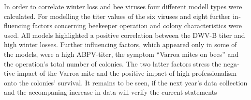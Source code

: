 \begin{otherlanguage}{english}
\newline
In order to correlate winter loss and bee viruses four different modell types were calculated. For modelling the titer values of the six viruses and eight further influencing factors concerning beekeeper operation and colony characteristics were used. All models highlighted a positive correlation between the DWV-B titer and high winter losses. Further influencing factors, which appeared only in some of the models, were a high ABPV-titer, the symptom \enquote{Varroa mites on bees} and the operation's total number of colonies. The two latter factors stress the negative impact of the Varroa mite and the positive impact of high professionalism onto the colonies' survival. It remains to be seen, if the next year's data collection and the accompaning increase in data will verify the current statements


\end{otherlanguage}
